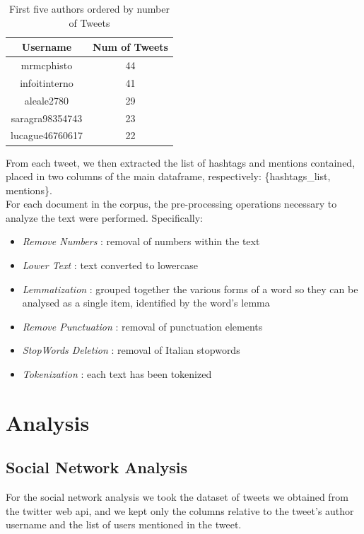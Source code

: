 \documentclass[12pt,journal,compsoc]{IEEEtran}
\begin{document}
\begin{table}[ht]
\centering
\begin{tabular}{c c }
	Username & Num of Tweets  \\
	\hline
	mrmcphisto & 44  \\
	infoitinterno & 41  \\
	aleale2780 & 29  \\
	saragra98354743 & 23  \\
	lucague46760617 & 22  \\
\end{tabular}
\caption{First five authors ordered by number of Tweets}
\end{table}

From each tweet, we then extracted the list of hashtags and mentions contained, placed in two columns of the main dataframe, respectively: \{hashtags\_list, mentions\}.\\
For each document in the corpus, the pre-processing operations necessary to analyze the text were performed. Specifically:

\begin{itemize}
	\item \textit{Remove Numbers} : removal of numbers within the text
	\item \textit{Lower Text} : text converted to lowercase
	\item \textit{Lemmatization} : grouped together the various forms of a word so they can be analysed as a single item, identified by the word's lemma
	\item \textit{Remove Punctuation} : removal of punctuation elements
	\item \textit{StopWords Deletion} : removal of Italian stopwords
	\item \textit{Tokenization} : each text has been tokenized
\end{itemize}

\section{Analysis}

\subsection{Social Network Analysis}
For the social network analysis we took the dataset of tweets we obtained from the twitter web api, and we kept only the columns relative to the tweet's author username and the list of users mentioned in the tweet.
 
\end{document}
